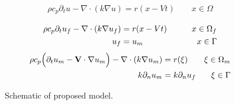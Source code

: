 \begin{align*}
  \rho c_p \partial_t u - \nabla \cdot (k \nabla u) = r(x - Vt) \qquad x \in \Omega
\end{align*}


\begin{align}
  \label{eq:pdeddf}
  \rho c_p \partial_t u_f - \nabla \cdot (k \nabla u_f) &= r(x - Vt) \qquad &x \in \Omega_f\\
  u_f &= u_m \qquad &x \in \Gamma \notag
\end{align}
\begin{align}
  \label{eq:pdeddm}
  \rho c_p \Big( \partial_t u_m - \mathbf{V} \cdot \nabla u_m \Big) -
  \nabla \cdot ( k \nabla u_m) &= r(\xi)  &\xi \in \Omega_m\\
  k \partial_n u_m &= k \partial_n u_f  &\xi \in \Gamma \notag
\end{align}

\begin{figure}
  \caption{Schematic of proposed model.}
  \label{fig:schematic}
\end{figure}
